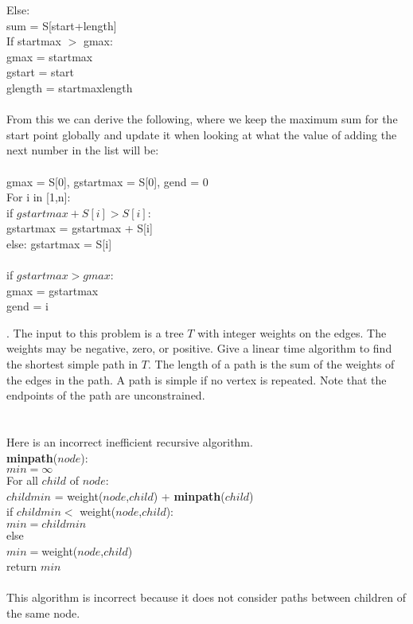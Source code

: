 \documentclass[10pt]{article}
\newcommand{\tab}{\hspace*{2em}}
\newcommand{\tabb}{\hspace*{4em}}
\newcommand{\tabbb}{\hspace*{6em}}
\begin{document}
			\tabb Else:\\
			\tabbb sum = S[start+length]\\
			\tab If startmax $>$ gmax:\\
			\tabb gmax = startmax\\
			\tabb gstart = start\\
			\tabb glength = startmaxlength\\
			\\
			\noindent
			From this we can derive the following, where we keep the maximum sum for the start point globally and update it when looking at what the value of adding the next number in the list will be:\\ 
			\\
			\newpage
			\noindent
			gmax = S[0], gstartmax = S[0], gend = 0\\
			For i in [1,n]:\\
			\tab if $gstartmax + S[i] > S[i]$:\\
			\tabb gstartmax = gstartmax + S[i]\\
			\tab else: gstartmax = S[i]\\
			\\
			\tab if $gstartmax > gmax$:\\
			\tabb gmax = gstartmax\\
			\tabb gend = i  
			
			
			\newpage
			.	The input to this problem is a tree $T$ with integer weights on the edges. The weights may be negative,
			zero, or positive.  Give a linear time algorithm to find the shortest simple path in $T$.  The length of a
			path is the sum of the weights of the edges in the path. A path is simple if no vertex is repeated. Note
			that the endpoints of the path are unconstrained.\\
			\\
			\\
			Here is an incorrect inefficient recursive algorithm.\\
			\textbf{minpath}($node$):\\
			\tab $min = \infty$\\
			\tab For all $child$ of $node$:\\
			\tabb $childmin$ = weight($node$,$child$) + \textbf{minpath}($child$)\\
			\tabb if $childmin < $ weight($node$,$child$):\\
			\tabbb $min = childmin$\\
			\tabb else\\
			\tabbb $min = $weight($node$,$child$)\\
			\tab return $min$\\
			\\
			This algorithm is incorrect because it does not consider paths between
			children of the same node.
\end{document}
